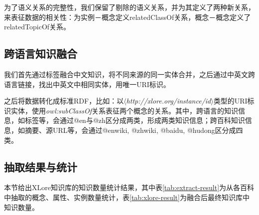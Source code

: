 
为了语义关系的完整性，我们保留了剔除的语义关系，并为其定义了两种新关系，来表征数据的相关性：为实例－概念定义relatedClassOf关系，概念－概念定义了relatedTopicOf关系。

\subsection{跨语言知识融合}


我们首先通过标签融合中文知识，将不同来源的同一实体合并，之后通过中英文跨语言链接，找出中英文中相同实体，用唯一URI标识。

之后将数据转化成标准RDF，比如：以$\langle$\emph{http://xlore.org/instance/id}$\rangle$类型的URI标识实体，使用\textit{owl:subClassOf}关系表征两个概念的关系。其中，跨语言的知识信息，如标签等，会通过@en与@zh区分成两类，形成两类知识信息；跨百科知识信息，如摘要、源URL等，会通过@enwiki, @zhwiki, @baidu, @hudong区分成四类。

\subsection{抽取结果与统计}
本节给出XLore知识库的知识数量统计结果，其中表\ref{tab:extract-result}为从各百科中抽取的概念、属性、实例数量统计，表\ref{tab:xlore-result}为融合后最终知识库中知识数量。

